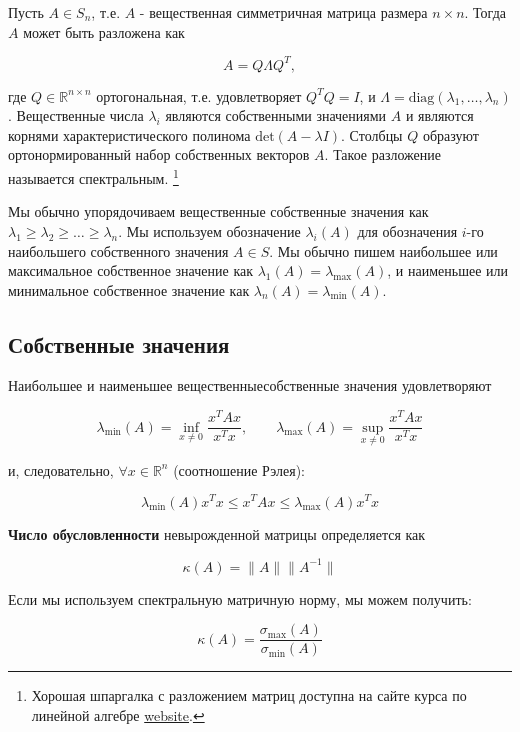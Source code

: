 \documentclass[
  russian,
  letterpaper,
  DIV=11,
  numbers=noendperiod]{scrartcl}
\begin{document}
Пусть \(A \in S_n\), т.е. \(A\) - вещественная симметричная матрица
размера \(n \times n\). Тогда \(A\) может быть разложена как

\[ 
A = Q\Lambda Q^T,
\]

где \(Q \in \mathbb{R}^{n \times n}\) ортогональная, т.е. удовлетворяет
\(Q^T Q = I\), и
\(\Lambda = \text{diag}(\lambda_1, \ldots , \lambda_n)\). Вещественные
числа \(\lambda_i\) являются собственными значениями \(A\) и являются
корнями характеристического полинома \(\text{det}(A - \lambda I)\).
Столбцы \(Q\) образуют ортонормированный набор собственных векторов
\(A\). Такое разложение называется спектральным. \footnote{Хорошая
  шпаргалка с разложением матриц доступна на сайте курса по линейной
  алгебре
  \href{https://nla.skoltech.ru/_files/decompositions.pdf}{website}.}

Мы обычно упорядочиваем вещественные собственные значения как
\(\lambda_1 \geq \lambda_2 \geq \ldots \geq \lambda_n\). Мы используем
обозначение \(\lambda_i(A)\) для обозначения \(i\)-го наибольшего
собственного значения \(A \in S\). Мы обычно пишем наибольшее или
максимальное собственное значение как
\(\lambda_1(A) = \lambda_{\text{max}}(A)\), и наименьшее или минимальное
собственное значение как \(\lambda_n(A) = \lambda_{\text{min}}(A)\).

\subsection{Собственные
значения}\label{ux441ux43eux431ux441ux442ux432ux435ux43dux43dux44bux435-ux437ux43dux430ux447ux435ux43dux438ux44f}

Наибольшее и наименьшее вещественныесобственные значения удовлетворяют

\[
\lambda_{\text{min}} (A) = \inf_{x \neq 0} \dfrac{x^T Ax}{x^T x}, \qquad \lambda_{\text{max}} (A) = \sup_{x \neq 0} \dfrac{x^T Ax}{x^T x}
\]

и, следовательно, \(\forall x \in \mathbb{R}^n\) (соотношение Рэлея):

\[
\lambda_{\text{min}} (A) x^T x \leq x^T Ax \leq \lambda_{\text{max}} (A) x^T x
\]

\textbf{Число обусловленности} невырожденной матрицы определяется как

\[
\kappa(A) = \|A\|\|A^{-1}\|
\]

Если мы используем спектральную матричную норму, мы можем получить:

\[
\kappa(A) = \dfrac{\sigma_{\text{max}}(A)}{\sigma _{\text{min}}(A)}
\]
\end{document}
